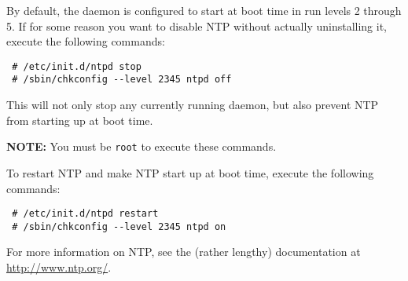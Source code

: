 By default, the  daemon is configured to start at boot time
in run levels 2 through 5.  If for some reason you want to disable NTP
without actually uninstalling it, execute the following commands:

\begin{verbatim}
 # /etc/init.d/ntpd stop
 # /sbin/chkconfig --level 2345 ntpd off
\end{verbatim}

This will not only stop any currently running  daemon, but
also prevent NTP from starting up at boot time.

\bigskip 

{\bf NOTE:} You must be {\tt root} to execute these commands.

\bigskip 

To restart NTP and make NTP start up at boot time, execute the following
commands:

\begin{verbatim}
 # /etc/init.d/ntpd restart
 # /sbin/chkconfig --level 2345 ntpd on
\end{verbatim}

For more information on NTP, see the (rather lengthy) documentation at
\url{http://www.ntp.org/}.
